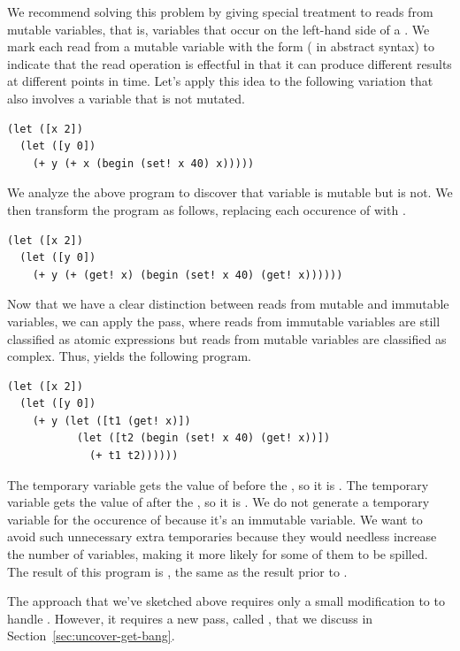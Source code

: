 \documentclass[7x10]{TimesAPriori_MIT}%
\begin{document}
{We recommend solving this problem by giving special treatment to reads
from mutable variables, that is, variables that occur on the left-hand
side of a . We mark each read from a mutable variable with
the form  ( in abstract syntax) to indicate
that the read operation is effectful in that it can produce different
results at different points in time. Let's apply this idea to the
following variation that also involves a variable that is not mutated.
\begin{lstlisting}
(let ([x 2])
  (let ([y 0])
    (+ y (+ x (begin (set! x 40) x)))))
\end{lstlisting}
We analyze the above program to discover that variable  is
mutable but  is not. We then transform the program as follows,
replacing each occurence of  with .
\begin{lstlisting}
(let ([x 2])
  (let ([y 0])
    (+ y (+ (get! x) (begin (set! x 40) (get! x))))))
\end{lstlisting}
Now that we have a clear distinction between reads from mutable and
immutable variables, we can apply the 
pass, where reads from immutable variables are still classified as
atomic expressions but reads from mutable variables are classified as
complex.  Thus,  yields the following
program.
\begin{lstlisting}
(let ([x 2])
  (let ([y 0])
    (+ y (let ([t1 (get! x)])
           (let ([t2 (begin (set! x 40) (get! x))])
             (+ t1 t2))))))
\end{lstlisting}
The temporary variable  gets the value of  before the
, so it is .  The temporary variable  gets
the value of  after the , so it is .  We
do not generate a temporary variable for the occurence of 
because it's an immutable variable. We want to avoid such unnecessary
extra temporaries because they would needless increase the number of
variables, making it more likely for some of them to be spilled.  The
result of this program is , the same as the result prior to
.

The approach that we've sketched above requires only a small
modification to  to handle
. However, it requires a new pass, called
, that we discuss in
Section~\ref{sec:uncover-get-bang}.

}
\end{document}
